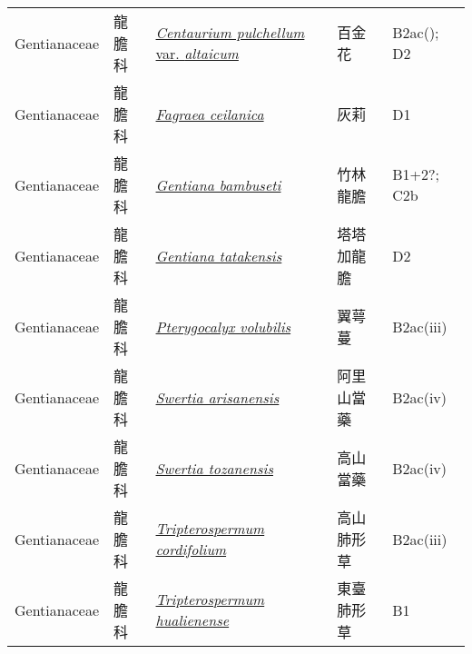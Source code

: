 {\begin{longtable}{p{2.5cm}p{2cm}p{5cm}p{2.5cm}p{3cm}}
    Gentianaceae & 龍膽科 & \href{http://www.theplantlist.org/tpl1.1/search?q=Centaurium+pulchellum+var.+altaicum}{\textit{Centaurium pulchellum} var. \textit{altaicum} } & 百金花 & B2ac(); D2 \index{Centaurium@\textit{Centaurium}!pulchellum@\textit{pulchellum}!var. altaicum@var. \textit{altaicum}}  \index{百金花} \\
    Gentianaceae & 龍膽科 & \href{http://www.theplantlist.org/tpl1.1/search?q=Fagraea+ceilanica}{\textit{Fagraea ceilanica} } & 灰莉 & D1 \index{Fagraea@\textit{Fagraea}!ceilanica@\textit{ceilanica}}  \index{灰莉} \\
    Gentianaceae & 龍膽科 & \href{http://www.theplantlist.org/tpl1.1/search?q=Gentiana+bambuseti}{\textit{Gentiana bambuseti} } & 竹林龍膽 & B1+2?; C2b \index{Gentiana@\textit{Gentiana}!bambuseti@\textit{bambuseti}}  \index{竹林龍膽} \\
    Gentianaceae & 龍膽科 & \href{http://www.theplantlist.org/tpl1.1/search?q=Gentiana+tatakensis}{\textit{Gentiana tatakensis} } & 塔塔加龍膽 & D2 \index{Gentiana@\textit{Gentiana}!tatakensis@\textit{tatakensis}}  \index{塔塔加龍膽} \\
    Gentianaceae & 龍膽科 & \href{http://www.theplantlist.org/tpl1.1/search?q=Pterygocalyx+volubilis}{\textit{Pterygocalyx volubilis} } & 翼萼蔓 & B2ac(iii) \index{Pterygocalyx@\textit{Pterygocalyx}!volubilis@\textit{volubilis}}  \index{翼萼蔓} \\
    Gentianaceae & 龍膽科 & \href{http://www.theplantlist.org/tpl1.1/search?q=Swertia+arisanensis}{\textit{Swertia arisanensis} } & 阿里山當藥 & B2ac(iv) \index{Swertia@\textit{Swertia}!arisanensis@\textit{arisanensis}}  \index{阿里山當藥} \\
    Gentianaceae & 龍膽科 & \href{http://www.theplantlist.org/tpl1.1/search?q=Swertia+tozanensis}{\textit{Swertia tozanensis} } & 高山當藥 & B2ac(iv) \index{Swertia@\textit{Swertia}!tozanensis@\textit{tozanensis}}  \index{高山當藥} \\
    Gentianaceae & 龍膽科 & \href{http://www.theplantlist.org/tpl1.1/search?q=Tripterospermum+cordifolium}{\textit{Tripterospermum cordifolium} } & 高山肺形草 & B2ac(iii) \index{Tripterospermum@\textit{Tripterospermum}!cordifolium@\textit{cordifolium}}  \index{高山肺形草} \\
    Gentianaceae & 龍膽科 & \href{http://www.theplantlist.org/tpl1.1/search?q=Tripterospermum+hualienense}{\textit{Tripterospermum hualienense} } & 東臺肺形草 & B1 \index{Tripterospermum@\textit{Tripterospermum}!hualienense@\textit{hualienense}}  \index{東臺肺形草} \\

\end{longtable}}
